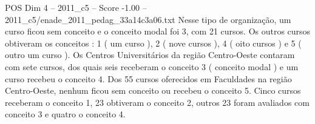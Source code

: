 \begin{textsample}{POS Dim 4 – 2011\_c5 – Score -1.00 – 2011\_c5/enade\_2011\_pedag\_33a14c3a06.txt}
Nesse tipo de organização, um curso ficou sem conceito e o conceito modal foi 3, com 21 cursos.
Os outros cursos obtiveram os conceitos : 1 ( um curso ), 2 ( nove cursos ), 4 ( oito cursos ) e 5 ( outro um curso ).
Os Centros Universitários da região Centro-Oeste contaram com sete cursos, dos quais seis receberam o conceito 3 ( conceito modal ) e um curso recebeu o conceito 4.
Dos 55 cursos oferecidos em Faculdades na região Centro-Oeste, nenhum ficou sem conceito ou recebeu o conceito 5.
Cinco cursos receberam o conceito 1, 23 obtiveram o conceito 2, outros 23 foram avaliados com conceito 3 e quatro o conceito 4.

\end{textsample}

